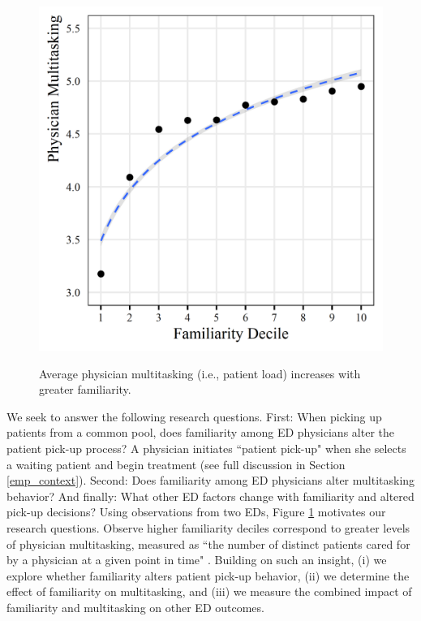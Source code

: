 \begin{figure}[!b]
     \centering
     \caption{Average physician multitasking (i.e., patient load) increases with greater familiarity.} \medskip
     \includegraphics[scale=1]{Figures/PU/Load v. Fam (Xtile).png}     
     \label{fig:load_fam}
 \end{figure}

 We seek to answer the following research questions. First: When picking up patients from a common pool, does familiarity among ED physicians alter the patient pick-up process? A physician initiates “patient pick-up" when she selects a waiting patient and begin treatment (see full discussion in Section \ref{emp_context}). Second: Does familiarity among ED physicians alter multitasking behavior? And finally: What other ED factors change with familiarity and altered pick-up decisions? Using observations from two EDs, Figure \ref{fig:load_fam} motivates our research questions. Observe higher familiarity deciles correspond to greater levels of physician multitasking, measured as “the number of distinct patients cared for by a physician at a given point in time" \citep[p. 169]{KC2014}. Building on such an insight, (i) we explore whether familiarity alters patient pick-up behavior, (ii) we determine the effect of familiarity on multitasking, and (iii) we measure the combined impact of familiarity and multitasking on other ED outcomes.
 
